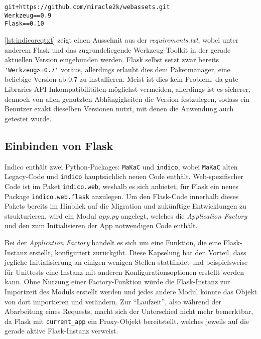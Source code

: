 \begin{lstlisting}[caption=Auszug aus der requirements.txt von Indico,label=lst:indicoreqtxt]
git+https://github.com/miracle2k/webassets.git
Werkzeug==0.9
Flask==0.10
\end{lstlisting}

\autoref{lst:indicoreqtxt} zeigt einen Ausschnit aus der \emph{requirements.txt}, wobei unter
anderem Flask und das zugrundeliegende Werkzeug-Toolkit in der gerade aktuellen Version eingebunden
werden. Flask selbst setzt zwar bereits \lstinline{'Werkzeug>=0.7'} voraus, allerdings erlaubt dies
dem Paketmanager, eine beliebige Version ab 0.7 zu installieren. Meist ist dies kein Problem, da
gute Libraries API-Inkompatibilitäten möglichst vermeiden, allerdings ist es sicherer, dennoch von
allen genutzten Abhängigkeiten die Version festzulegen, sodass ein Benutzer exakt dieselben
Versionen nutzt, mit denen die Anwendung auch getestet wurde.


\subsection{Einbinden von Flask}

Indico enthält zwei Python-Packages: \lstinline{MaKaC} und \lstinline{indico}, wobei
\lstinline{MaKaC} alten Legacy-Code und \lstinline{indico} hauptsächlich neuen Code enthält.
Web-spezifischer Code ist im Paket \lstinline{indico.web}, weshalb es sich anbietet, für Flask ein
neues Package \lstinline{indico.web.flask} anzulegen. Um den Flask-Code innerhalb dieses Pakets
bereits im Hinblick auf die Migration und zukünftige Entwicklungen zu strukturieren, wird ein Modul
\emph{app.py} angelegt, welches die \emph{Application Factory} und den zum Initialisieren der App
notwendigen Code enthält.

Bei der \emph{Application Factory} handelt es sich um eine Funktion, die eine Flask-Instanz
erstellt, konfiguriert zurückgibt. Diese Kapselung hat den Vorteil, dass jegliche Initialisierung an
einigen wenigen Stellen stattfindet und beispielsweise für Unittests eine Instanz mit anderen
Konfigurationsoptionen erstellt werden kann. Ohne Nutzung einer Factory-Funktion würde die
Flask-Instanz zur Importzeit des Moduls erstellt werden und jedes andere Modul könnte das Objekt von
dort importieren und verändern. Zur \enquote{Laufzeit}, also während der Abarbeitung eines Requests,
macht sich der Unterschied nicht mehr bemerktbar, da Flask mit \lstinline{current_app} ein
Proxy-Objekt bereitstellt, welches jeweils auf die gerade aktive Flask-Instanz verweist.

